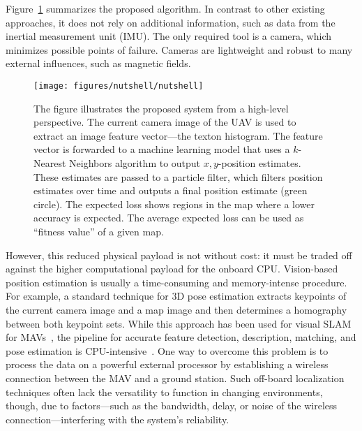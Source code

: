 \documentclass{report}
\begin{document}
Figure~\ref{fig:highleveloverview} summarizes the proposed
algorithm. In contrast to other existing approaches, it does not rely
on additional information, such as data from the inertial measurement
unit (IMU). The only required tool is a camera, which minimizes
possible points of failure. Cameras are lightweight and robust to many
external influences, such as magnetic fields.

\begin{figure}[h!]
\begin{center}
\texttt{[image: figures/nutshell/nutshell]}
\caption{{\label{fig:highleveloverview} The figure illustrates the
    proposed system from a high-level perspective. The current camera
    image of the UAV is used to extract an image feature vector---the
    texton histogram. The feature vector is forwarded to a machine
    learning model that uses a $k$-Nearest Neighbors algorithm to
    output $x,y$-position estimates. These estimates are passed to a
    particle filter, which filters position estimates over time and
    outputs a final position estimate (green circle). The expected
    loss shows regions in the map where a lower accuracy is
    expected. The average expected loss can be used as ``fitness
    value'' of a given map.%
  }}
\end{center}
\end{figure}

However, this reduced physical payload is not without cost: it must be
traded off against the higher computational payload for the onboard
CPU. Vision-based position estimation is usually a time-consuming and
memory-intense procedure.  For example, a standard technique for 3D
pose estimation extracts keypoints of the current camera image and a
map image and then determines a homography between both keypoint
sets. While this approach has been used for visual SLAM for
MAVs~\cite{blosch2010vision}, the pipeline for accurate feature
detection, description, matching, and pose estimation is
CPU-intensive~\cite{kendall2015convolutional}.  One way to overcome
this problem is to process the data on a powerful external processor
by establishing a wireless connection between the MAV and a ground
station. Such off-board localization techniques often lack the
versatility to function in changing environments, though, due to
factors---such as the bandwidth, delay, or noise of the wireless
connection---interfering with the system's reliability.
\end{document}

